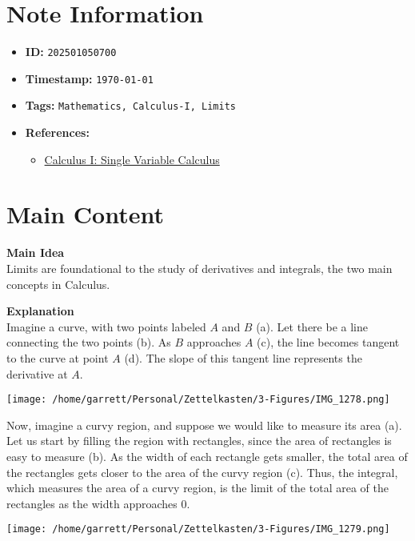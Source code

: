 \clearpage
{}
\label{202501050700}
\renewcommand{\notetitle}{Motivation for Limits}

\section*{Note Information}
\begin{itemize}
  \item \textbf{ID:} \texttt{202501050700}
  \item \textbf{Timestamp:} \texttt{\today \ \currenttime}
  \item \textbf{Tags:} \texttt{Mathematics, Calculus-I, Limits}
  \item \textbf{References:}
    \begin{itemize}
      \item \href{https://ocw.mit.edu/courses/18-01-calculus-i-single-variable-calculus-fall-2020/}{Calculus I: Single Variable Calculus}
    \end{itemize}
\end{itemize}


\section*{Main Content}
\textbf{Main Idea}\\
Limits are foundational to the study of derivatives and integrals, the two main concepts in Calculus. 

\textbf{Explanation}\\
Imagine a curve, with two points labeled $A$ and $B$ (a). Let there be a line connecting the two points (b).
As $B$ approaches $A$ (c), the line becomes tangent to the curve at point $A$ (d). The slope of this tangent line represents the derivative at $A$.\\
\begin{center}
  \texttt{[image: /home/garrett/Personal/Zettelkasten/3-Figures/IMG\_1278.png]}
\end{center}
Now, imagine a curvy region, and suppose we would like to measure its area (a). Let us start by filling the region with rectangles, since the area of rectangles is easy to measure (b).
As the width of each rectangle gets smaller, the total area of the rectangles gets closer to the area of the curvy region (c). Thus, the integral, which measures the area of a curvy region, 
is the limit of the total area of the rectangles as the width approaches 0.\\
\begin{center}
  \texttt{[image: /home/garrett/Personal/Zettelkasten/3-Figures/IMG\_1279.png]}
\end{center}


